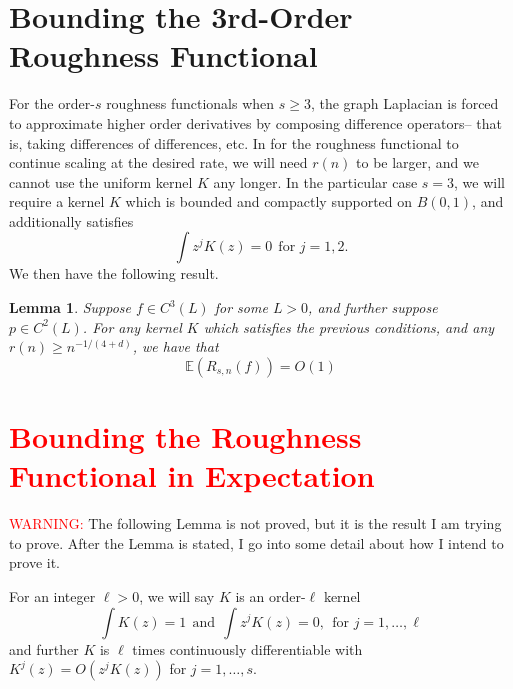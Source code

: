 \documentclass{article}
\newcommand{\1}{\mathbf{1}}
\newcommand{\Ebb}{\mathbb{E}}
\theoremstyle{alden}
\theoremstyle{aldenthm}
\newtheorem{lemma}{Lemma}
\theoremstyle{definition}
\theoremstyle{remark}
\begin{document}
\section{Bounding the 3rd-Order Roughness Functional}

For the order-$s$ roughness functionals when $s \geq 3$, the graph Laplacian is forced to approximate higher order derivatives by composing difference operators-- that is, taking differences of differences, etc. In for the roughness functional to continue scaling at the desired rate, we will need $r(n)$ to be larger, and we cannot use the uniform kernel $K$ any longer. In the particular case $s = 3$, we will require a kernel $K$ which is bounded and compactly supported on $B(0,1)$, and additionally satisfies
\begin{equation*}
\int z^j K(z) = 0~~\textrm{for $j = 1,2$.}
\end{equation*}
We then have the following result.
\begin{lemma}
	\label{lem:3rd_order_roughness_functional}
	Suppose $f \in C^{3}(L)$ for some $L > 0$, and further suppose $p \in C^{2}(L)$. For any kernel $K$ which satisfies the previous conditions, and any $r(n) \geq n^{-1/(4+d)}$, we have that
	\begin{equation*}
	\Ebb(R_{s,n}(f)) = O(1)
	\end{equation*} 
\end{lemma}

\section{\textcolor{red}{Bounding the Roughness Functional in Expectation}}

\textcolor{red}{WARNING:} The following Lemma is not proved, but it is the result I am trying to prove. After the Lemma is stated, I go into some detail about how I intend to prove it. 

For an integer $\ell > 0$, we will say $K$ is an order-$\ell$ kernel
\begin{equation*}
\int K(z) = 1 ~~\textrm{and}~~\int z^j K(z) = 0,~~\textrm{for $j = 1,\ldots,\ell$}
\end{equation*}
and further $K$ is $\ell$ times continuously differentiable with $K^{j}(z) = O(z^j K(z))$ for $j = 1,\ldots,s$.
\end{document}
